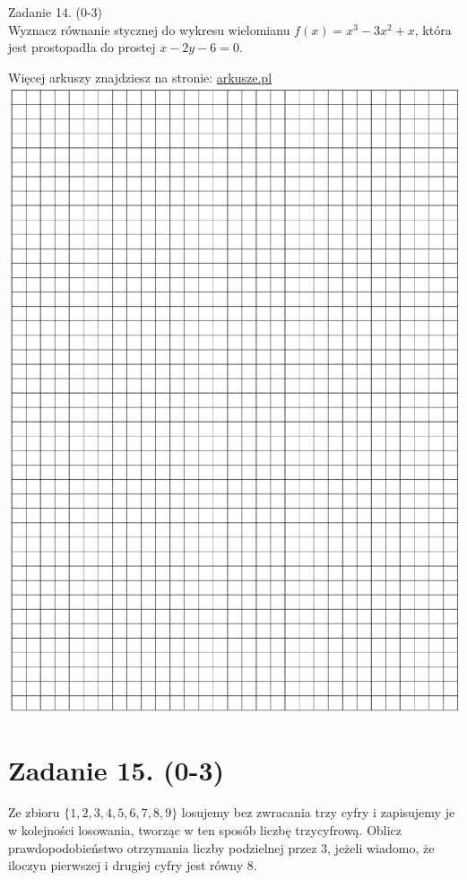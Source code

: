 \documentclass[10pt]{article}
\begin{document}
Zadanie 14. (0-3)\\
Wyznacz równanie stycznej do wykresu wielomianu \(f(x)=x^{3}-3 x^{2}+x\), która jest prostopadła do prostej \(x-2 y-6=0\).

Więcej arkuszy znajdziesz na stronie: \href{http://arkusze.pl}{arkusze.pl}\\
\includegraphics[max width=\textwidth, center]{2024_11_21_8206013b40ecc9b11a30g-10}

\section*{Zadanie 15. (0-3)}
Ze zbioru \(\{1,2,3,4,5,6,7,8,9\}\) losujemy bez zwracania trzy cyfry i zapisujemy je w kolejności losowania, tworząc w ten sposób liczbę trzycyfrową. Oblicz prawdopodobieństwo otrzymania liczby podzielnej przez 3, jeżeli wiadomo, że iloczyn pierwszej i drugiej cyfry jest równy 8.
\end{document}
